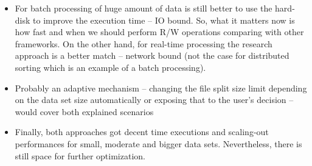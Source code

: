 \begin{itemize}
	\item For batch processing of huge amount of data is still better to use the hard-disk to improve the execution time -- IO bound. So, what it matters now is how fast and when we should perform R/W operations comparing with other frameworks. On the other hand, for real-time processing the research approach is a better match -- network bound (not the case for distributed sorting which is an example of a batch processing).
	\item Probably an adaptive mechanism -- changing the file split size limit depending on the data set size automatically or exposing that to the user's decision -- would cover both explained scenarios
	\item Finally, both approaches got decent time executions and scaling-out performances for small, moderate and bigger data sets. Nevertheless, there is still space for further optimization. 
\end{itemize}

